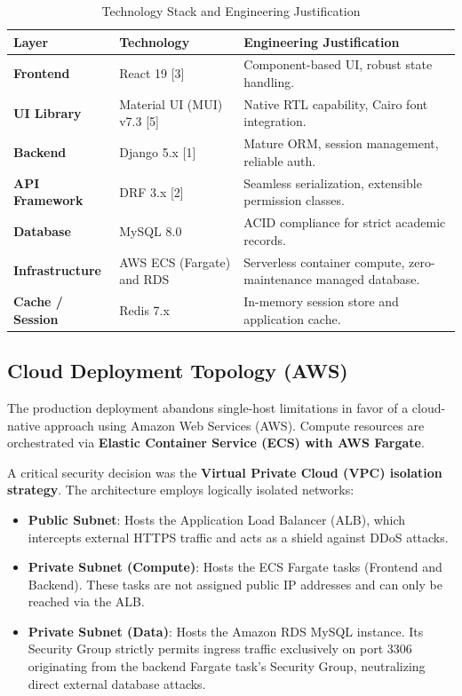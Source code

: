 \begin{table}[H]
    \centering
    \renewcommand{\arraystretch}{1.3}
    \begin{tabular}{|p{}|p{}|p{}|}
        \hline
        \textbf{Layer} & \textbf{Technology} & \textbf{Engineering Justification} \\
        \hline
        \textbf{Frontend} & React 19 [3] & Component-based UI, robust state handling. \\
        \textbf{UI Library} & Material UI (MUI) v7.3 [5] & Native RTL capability, Cairo font integration. \\
        \textbf{Backend} & Django 5.x [1] & Mature ORM, session management, reliable auth. \\
        \textbf{API Framework} & DRF 3.x [2] & Seamless serialization, extensible permission classes. \\
        \textbf{Database} & MySQL 8.0 & ACID compliance for strict academic records. \\
        \textbf{Infrastructure} & AWS ECS (Fargate) and RDS & Serverless container compute, zero-maintenance managed database. \\
        \textbf{Cache / Session} & Redis 7.x & In-memory session store and application cache. \\
        \hline
    \end{tabular}
    \caption{Technology Stack and Engineering Justification}
    \label{tab:tech_stack}
\end{table}

\subsection{Cloud Deployment Topology (AWS)}

The production deployment abandons single-host limitations in favor of a cloud-native approach using Amazon Web Services (AWS). Compute resources are orchestrated via \textbf{Elastic Container Service (ECS) with AWS Fargate}.

A critical security decision was the \textbf{Virtual Private Cloud (VPC) isolation strategy}. The architecture employs logically isolated networks:
\begin{itemize}
    \item \textbf{Public Subnet}: Hosts the Application Load Balancer (ALB), which intercepts external HTTPS traffic and acts as a shield against DDoS attacks.
    \item \textbf{Private Subnet (Compute)}: Hosts the ECS Fargate tasks (Frontend and Backend). These tasks are not assigned public IP addresses and can only be reached via the ALB.
    \item \textbf{Private Subnet (Data)}: Hosts the Amazon RDS MySQL instance. Its Security Group strictly permits ingress traffic exclusively on port 3306 originating from the backend Fargate task's Security Group, neutralizing direct external database attacks.
\end{itemize}

